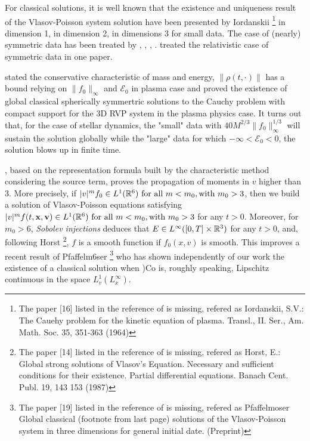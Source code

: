 For classical solutions, it is well known that the existence and
uniqueness result of the Vlasov-Poisson system solution have been presented by Iordanskii \footnote{The paper [16] listed in the reference of \cite{1991InMat.105..415L} is missing, refered as Iordanskii, S.V.: The Cauehy problem for the kinetic equation of plasma. Transl., II. Ser.,
Am. Math. Soc. 35, 351-363 (1964)} in dimension
1, \cite{ukai1978classical} in dimension 2, \cite{bardos1985global} in dimensions
3 for small data. 
The case of (nearly) symmetric data has been treated by \cite{batt1977global}, \cite{wollman1980global}, \cite{horst1981classical}, \cite{schaeffer1987global}. \cite{schaeffer1987global} treated the relativistic case of symmetric data in one paper.


\cite{glassey_symmetric_1985} stated the conservative characteristic of mass and energy, $\|\rho(t,\cdot)\|$ has a bound relying on $\|f_0\|_\infty$ and $\mathscr{E}_0$ in plasma case and proved the existence of global classical spherically symmertric solutions to the Cauchy problem with compact support for the 3D RVP system in the plasma physics case. It turns out that, for the case of stellar dynamics, the "small" data with $40M^{2/3}\|f_0\|_\infty^{1/3}$ will sustain the solution globally while the "large" data for which $-\infty <\mathscr{E}_0<0$, the solution blows up in finite time.

\cite{1991InMat.105..415L}, based on the representation formula built by the characteristic method considering the source term, proves the propagation of moments in $v$ higher than 3.
More precisely, if $|v|^m f_0\in L^1({\mathbb{R}}^6)\text{ for all }m<m_0,\text{with } m_0> 3$, then we build a solution
of Vlasov-Poisson equations satisfying $|v|^m f(t, \mathbf{x}, \mathbf{v})\in L^1({\mathbb{R}}^6)\text{ for all }m<m_0,\text{with } m_0> 3$ for any $t>0$. Moreover, for $m_0>6$, \emph{Sobolev injections}  deduces that $E\in L^\infty( [0, T]\times {\mathbb{R}}^{3} )$ for any $t>0$, and,
following Horst \footnote{The paper [14] listed in the reference of \cite{1991InMat.105..415L} is missing, refered as Horst, E.: Global strong solutions of Vlasov's Equation. Necessary and sufficient conditions
for their existence. Partial differential equations. Banach Cent. Publ. 19, 143 153 (1987)}, $f$ is a smooth function if $f_0(x, v)$ is smooth. This improves
a recent result of Pfaffelm6ser \footnote{The paper [19] listed in the reference of \cite{1991InMat.105..415L} is missing, refered as Pfaffelmoser Global classical (footnote from last page) solutions of the Vlasov-Poisson system in three dimensions
for general initial date. (Preprint)} who has shown independently of our work
the existence of a classical solution when )Co is, roughly speaking, Lipschitz
continuous in the space $L_v^{1}(L_x^\infty)$. 



